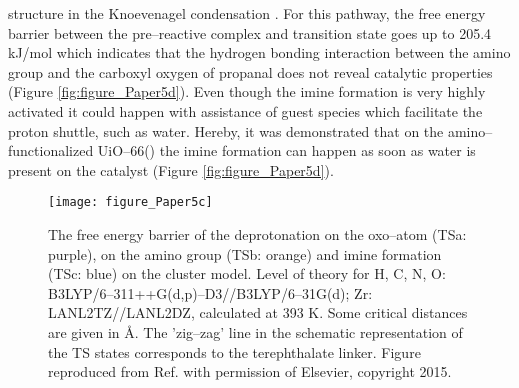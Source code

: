 structure in the Knoevenagel condensation \cite{Cortese2011,
Panchenko2014, Yang2014}. For this pathway, the free energy barrier between the
pre--reactive complex and transition state goes up to 205.4 kJ/mol which
indicates that the hydrogen bonding interaction between the amino group and the
carboxyl oxygen of propanal does not reveal catalytic properties (Figure
\ref{fig:figure_Paper5d}). Even though the imine formation is very highly
activated it could happen with assistance of guest species which facilitate the proton shuttle, such as water. Hereby, it was demonstrated that on the
amino--functionalized UiO--66() the imine formation can happen as soon
as water is present on the catalyst (Figure \ref{fig:figure_Paper5d}). 

\begin{figure}[!htp]
	\centering
	\texttt{[image: figure\_Paper5c]}
	\caption[The free energy barrier of the deprotonation on the oxo--atom (TSa:
	purple), on the amino group (TSb: orange) and imine formation (TSc:
	blue) on the cluster model. Level of theory for H, C, N, O: B3LYP/6--311++G(d,p)--D3//B3LYP/6--31G(d); Zr:
	LANL2TZ// LANL2DZ, calculated at 393 K. Some critical distances are given in
	\AA. The 'zig--zag' line in the schematic representation of the TS states corresponds to the terephthalate linker.] {The free energy barrier of the deprotonation on
	the oxo--atom (TSa:
	purple), on the amino group (TSb: orange) and imine formation (TSc:
	blue) on the cluster model. Level of theory for H, C, N, O: B3LYP/6--311++G(d,p)--D3//B3LYP/6--31G(d); Zr:
	LANL2TZ//LANL2DZ, calculated at 393 K. Some critical distances are given in \AA. The 'zig--zag' line in the schematic
representation of the TS states corresponds to the terephthalate linker. Figure
reproduced from Ref. \cite{Hajek2015} with permission of Elsevier, copyright
2015.}
	\label{fig:figure_Paper5c}
\end{figure}
\npar

